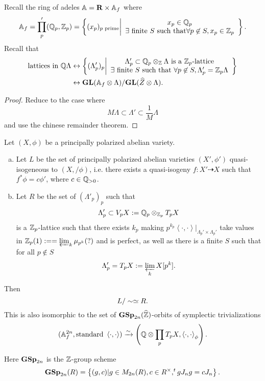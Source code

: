 Recall the ring of adeles $\mathbb{A} = \mathbf{R}\times \mathbb{A}_f$ where
\[
	\mathbb{A}_f = \prod_p'(\mathbb Q_p,\mathbb Z_p) = \left\{ (x_p)_{p\text{ prime}} \middle|
		\begin{array}{c}
			x_p\in \mathbb Q_p \\
			\exists \text{ finite }S\text{ such that}\forall p\not\in S,x_p\in \mathbb Z_p
	\end{array}\right\} .
\]
Recall that
\begin{align*}
	\text{lattices in }\mathbb Q\Lambda &\leftrightarrow \left\{ (\Lambda'_p)_p \middle|
		\begin{array}{c}
			\Lambda'_p\subset \mathbb Q_p\otimes_\mathbb Z\Lambda\text{ is a }\mathbb Z_p\text{-lattice} \\
			\exists \text{ finite }S\text{ such that }\forall p\not\in S, \Lambda'_p = \mathbb Z_p\Lambda
	\end{array}\right\} \\
	&\leftrightarrow \mathbf{GL}(\mathbb{A}_f\otimes\Lambda) /\mathbf{GL}(\widehat{Z}\otimes \Lambda).
\end{align*}
\begin{proof}
	Reduce to the case where
	\[
		M\Lambda \subset \Lambda' \subset \frac{1}{M}\Lambda
	\]
	and use the chinese remainder theorem.
\end{proof}
\begin{proposition}
	Let $(X,\phi)$ be a principally polarized abelian variety.
	\begin{enumerate}[(a)]
		\item Let $L$ be the set of principally polarized abelian varieties $(X',\phi')$
			quasi-isogeneous to $(X, /\phi)$, i.e. there exists a quasi-isogeny
			$f:X'\dashrightarrow X$ such that $f^{*}\phi = c\phi'$, where $c\in \mathbb Q_{>0}$.
		\item Let $R$ be the set of $(\Lambda'_p)_p$ such that
			\[
				\Lambda'_p \subset V_pX := \mathbb Q_p \otimes_{\mathbb Z_p}T_pX
			\]
			is a $\mathbb Z_p$-lattice such that there exists $k_p$ making $p^{k_p}\left<\cdot ,\cdot
			\right>|_{\Lambda_p'\times \Lambda_p'}$ take values in $\mathbb Z_p(1):= = \varprojlim_k
			\mu_{p^{k}}(?)$ and is perfect, as well as there is a finite $S$ such that for all $p\not\in S$
			\[
				\Lambda_p' = T_pX := \varprojlim_k X[p^{k}].
			\]
	\end{enumerate}
	Then
	\[
		L /\sim \simeq R.
	\]
	This is also isomorphic to the set of $\mathbf{GSp}_{2n}(\widehat{\mathbb Z})$-orbits of symplectic trivializations
	\[
		(\mathbb{A}_f^{2n},\text{standard }\left<\cdot ,\cdot  \right>) \xrightarrow{\sim} \left( \mathbb Q\otimes \prod_p
		T_p X, \left<\cdot ,\cdot  \right>_\phi \right) .
	\]
\end{proposition}
Here $\mathbf{GSp}_{2n}$ is the $\mathbb Z$-group scheme
\[
	\mathbf{GSp}_{2n}(R) = \left\{ (g,c) | g\in M_{2n}(R),c\in R^{\times }, ^{t}gJ_ng = cJ_n \right\} .
\]

